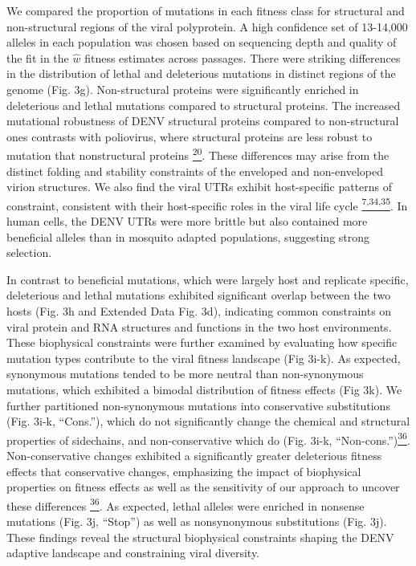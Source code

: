 \documentclass[
]{article}
\begin{document}
We compared the proportion of mutations in each fitness class for
structural and non-structural regions of the viral polyprotein. A high
confidence set of 13-14,000 alleles in each population was chosen based
on sequencing depth and quality of the fit in the \(\widehat{w}\)
fitness estimates across passages. There were striking differences in
the distribution of lethal and deleterious mutations in distinct regions
of the genome (Fig. 3g). Non-structural proteins were significantly
enriched in deleterious and lethal mutations compared to structural
proteins. The increased mutational robustness of DENV structural
proteins compared to non-structural ones contrasts with poliovirus,
where structural proteins are less robust to mutation that nonstructural
proteins
\href{https://paperpile.com/c/REZjPf/bczFl}{\textsuperscript{20}}. These
differences may arise from the distinct folding and stability
constraints of the enveloped and non-enveloped virion structures. We
also find the viral UTRs exhibit host-specific patterns of constraint,
consistent with their host-specific roles in the viral life cycle
\href{https://paperpile.com/c/REZjPf/r0H6+delW7+4f1JN}{\textsuperscript{7,34,35}}.
In human cells, the DENV UTRs were more brittle but also contained more
beneficial alleles than in mosquito adapted populations, suggesting
strong selection.

In contrast to beneficial mutations, which were largely host and
replicate specific, deleterious and lethal mutations exhibited
significant overlap between the two hosts (Fig. 3h and Extended Data
Fig. 3d), indicating common constraints on viral protein and RNA
structures and functions in the two host environments. These biophysical
constraints were further examined by evaluating how specific mutation
types contribute to the viral fitness landscape (Fig 3i-k). As expected,
synonymous mutations tended to be more neutral than non-synonymous
mutations, which exhibited a bimodal distribution of fitness effects
(Fig 3k). We further partitioned non-synonymous mutations into
conservative substitutions (Fig. 3i-k, ``Cons.''), which do not
significantly change the chemical and structural properties of
sidechains, and non-conservative which do (Fig. 3i-k,
``Non-cons.'')\href{https://paperpile.com/c/REZjPf/EVbva}{\textsuperscript{36}}.
Non-conservative changes exhibited a significantly greater deleterious
fitness effects that conservative changes, emphasizing the impact of
biophysical properties on fitness effects as well as the sensitivity of
our approach to uncover these differences
\href{https://paperpile.com/c/REZjPf/EVbva}{\textsuperscript{36}}. As
expected, lethal alleles were enriched in nonsense mutations (Fig. 3j,
``Stop'') as well as nonsynonymous substitutions (Fig. 3j). These
findings reveal the structural biophysical constraints shaping the DENV
adaptive landscape and constraining viral diversity.
\end{document}
